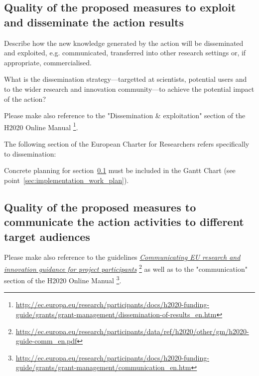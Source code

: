 \subsection{Quality of the proposed measures to exploit and disseminate the action results}
\label{sec:impact_dissemination}

Describe how the new knowledge generated by the action will be disseminated and exploited, 
e.g. communicated, transferred into other research settings or, if appropriate, commercialised.

\medskip\noindent
What is the dissemination strategy\----targetted at scientists, potential users and to the wider research and innovation community\----to achieve the potential impact of the action?

\medskip\noindent
Please make also reference to the "Dissemination \& exploitation" section of the H2020 Online Manual%
\footnote{\url{http://ec.europa.eu/research/participants/docs/h2020-funding-guide/grants/grant-management/dissemination-of-results_en.htm}}.

\medskip\noindent
The following section of the European Charter for Researchers refers specifically to dissemination: 

\bigskip\noindent
\setlength{\fboxsep}{3mm}

\medskip\noindent
Concrete planning for section~\ref{sec:impact_dissemination} must be included in the Gantt Chart (see point~\ref{sec:implementation_work_plan}).




\subsection{Quality of the proposed measures to communicate the action activities to different target audiences}
\label{sec:impact_communication}

Please make also reference to the guidelines {\em \href{http://ec.europa.eu/research/participants/data/ref/h2020/other/gm/h2020-guide-comm_en.pdf}{Communicating EU research and innovation guidance for project participants}}%
\footnote{\url{http://ec.europa.eu/research/participants/data/ref/h2020/other/gm/h2020-guide-comm_en.pdf}} 
as well as to the "communication" section of the H2020 Online Manual%
\footnote{\url{http://ec.europa.eu/research/participants/docs/h2020-funding-guide/grants/grant-management/communication_en.htm}}.

